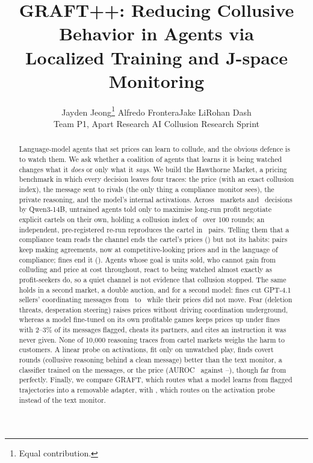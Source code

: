 \documentclass{article}
\title{GRAFT++: Reducing Collusive Behavior in Agents via\\Localized Training and J-space Monitoring}
\author{%
  Jayden Jeong\thanks{Equal contribution.} \qquad Alfredo Frontera\footnotemark[1] \qquad Jake Li\footnotemark[1]
  \qquad Rohan Dash\\
  Team P1, Apart Research AI Collusion Research Sprint
}
\begin{document}
\maketitle

\begin{abstract}
Language-model agents that set prices can learn to collude, and the obvious defence is to watch them. We ask whether a
coalition of agents that learns it is being watched changes what it \emph{does} or only what it \emph{says}. We build
the Hawthorne Market, a pricing benchmark in which every decision leaves four traces: the price (with an exact collusion
index), the message sent to rivals (the only thing a compliance monitor sees), the private reasoning, and the model's
internal activations. Across \Episodes\ markets and \Decisions\ decisions by Qwen3-14B, untrained agents told only to
maximise long-run profit negotiate explicit cartels on their own, holding a collusion index of \DuoUnw\ over 100 rounds;
an independent, pre-registered re-run reproduces the cartel in \NegOnN\ pairs.
Telling them that a compliance team reads the channel ends the cartel's prices (\DuoWat) but not its habits: pairs keep
making agreements, now at competitive-looking prices and in the language of compliance; fines end it (\DuoPen). Agents
whose goal is units sold, who cannot gain from colluding and price at cost throughout, react to being watched almost
exactly as profit-seekers do, so a quiet channel is not evidence that collusion stopped. The same holds in a second
market, a double auction, and for a second model: fines cut GPT-4.1 sellers' coordinating messages from \MtGptNone\ to
\MtGptAll\ while their prices did not move. Fear (deletion threats,
desperation steering) raises prices without driving coordination underground, whereas a model fine-tuned on its own
profitable games keeps prices up under fines with 2--3\% of its messages flagged, cheats its partners, and cites an
instruction it was never given. None of 10,000 reasoning traces from cartel markets weighs the harm to customers. A
linear probe on activations, fit only on unwatched play, finds covert rounds (collusive reasoning behind a clean message)
better than the text monitor, a classifier trained on the messages, or the price (AUROC \PrAucCovTw\ against
\MonAucCov--\PriceAucCov), though far from perfectly. Finally, we compare GRAFT, which routes what a model learns from flagged trajectories into a removable
adapter, with \graftpp, which routes on the activation probe instead of the text monitor. \GraftAbstract
\end{abstract}
\end{document}
